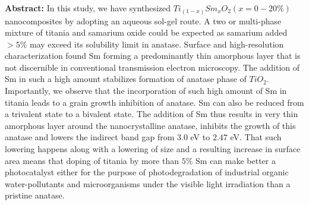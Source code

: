 \documentclass[a4paper,20pt]{article}
\begin{document}
    \begin{minipage}{.59\linewidth} \begin{flushleft}
    
    		\textbf{Abstract:} In this study, we have synthesized $Ti_{(1-x)}Sm_{x}O_{2} (x = 0-20\%)$ nanocomposites by adopting an aqueous sol-gel route. A two or multi-phase mixture of titania and samarium oxide could be expected as samarium added $>5\%$ may exceed its solubility limit in anatase. Surface and high-resolution characterization found Sm forming a predominantly thin amorphous layer that is not discernible in conventional transmission electron microscopy. The addition of Sm in such a high amount stabilizes formation of anatase phase of $TiO_2$. Importantly, we observe that the incorporation of such high amount of Sm in titania leads to a grain growth inhibition of anatase. Sm can also be reduced from a trivalent state to a bivalent state. The addition of Sm thus results in very thin amorphous layer around the nanocrystalline anatase, inhibits the growth of this anatase and lowers the indirect band gap from $3.0$ eV to $2.47$ eV. That such lowering happens along with a lowering of size and a resulting increase in surface area means that doping of titania by more than $5\%$ Sm can make better a photocatalyst either for the purpose of photodegradation of industrial organic water-pollutants and microorganisms under the visible light irradiation than a pristine anatase. 
    	\end{flushleft} \end{minipage}
    \hfill 
\end{document}
